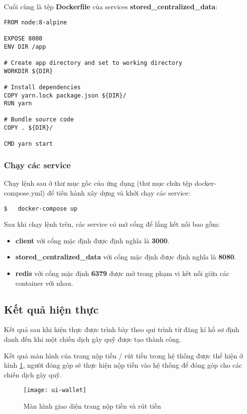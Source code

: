 \documentclass[../main-report.tex]{subfiles}
\begin{document}
Cuối cùng là tệp \textbf{Dockerfile} của services \textbf{stored\_centralized\_data}:

\begin{lstlisting}
FROM node:8-alpine

EXPOSE 8080
ENV DIR /app

# Create app directory and set to working directory
WORKDIR ${DIR}

# Install dependencies
COPY yarn.lock package.json ${DIR}/
RUN yarn

# Bundle source code
COPY . ${DIR}/

CMD yarn start
\end{lstlisting}
\subsubsection{Chạy các service}
\label{sec:run-service}
Chạy lệnh sau ở thư mục gốc của ứng dụng (thư mục chứa tệp docker-compose.yml) để tiến hành xây dựng và khởi chạy các service:

\begin{lstlisting}
$	docker-compose up
\end{lstlisting}

Sau khi chạy lệnh trên, các service có mở cổng để lắng kết nối bao gồm:

\begin{itemize}
\item \textbf{client} với cổng mặc định được định nghĩa là \textbf{3000}.
\item \textbf{stored\_centralized\_data} với cổng mặc định được định nghĩa là \textbf{8080}.
\item \textbf{redis} với cổng mặc định \textbf{6379} được mở trong phạm vi kết nối giữa các container với nhau.
\end{itemize}

\subsection{Kết quả hiện thực}
Kết quả sau khi hiện thực được trình bày theo qui trình từ đăng kí hồ sơ định danh đến khi một chiến dịch gây quỹ được tạo thành công.

Kết quả màn hình của trang nộp tiền / rút tiền trong hệ thống được thể hiện ở hình \ref{fig:ui-wallet}, người đóng góp sẽ thực hiện nộp tiền vào hệ thống để đóng góp cho các chiến dịch gây quỹ.

\begin{figure}[ht!]
\begin{center}
\label{fig:ui-wallet}
\texttt{[image: ui-wallet]}
\caption{Màn hình giao diện trang nộp tiền và rút tiền}
\end{center}
\end{figure}
\end{document}
